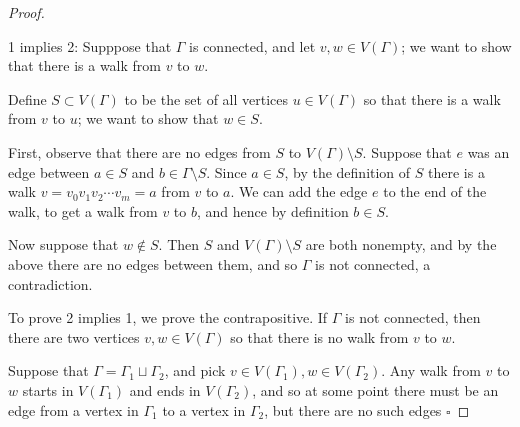 \documentclass[10pt,]{book}
\theoremstyle{plain}
\theoremstyle{definition}
\theoremstyle{definition}
\theoremstyle{definition}
\theoremstyle{definition}
\numberwithin{equation}{section}
\begin{document}
\begin{proof}\hypertarget{proof-2}{}
\hypertarget{p-99}{}%
1 implies 2: Supppose that \(\Gamma\) is connected, and let \(v, w\in V(\Gamma)\); we want to show that there is a walk from \(v\) to \(w\).%
\par
\hypertarget{p-100}{}%
Define \(S\subset V(\Gamma)\) to be the set of all vertices \(u\in V(\Gamma)\) so that there is a walk from \(v\) to \(u\); we want to show that \(w\in S\).%
\par
\hypertarget{p-101}{}%
First, observe that there are no edges from \(S\) to \(V(\Gamma)\setminus S\).  Suppose that \(e\) was an edge between \(a\in S\) and \(b\in\Gamma\setminus S\).  Since \(a\in S\), by the definition of \(S\) there is a walk \(v=v_0v_1v_2\cdots v_m=a\) from \(v\) to \(a\).  We can add the edge \(e\) to the end of the walk, to get a walk from \(v\) to \(b\), and hence by definition \(b\in S\).%
\par
\hypertarget{p-102}{}%
Now suppose that \(w\notin S\).  Then \(S\) and \(V(\Gamma)\setminus S\) are both nonempty, and by the above there are no edges between them, and so \(\Gamma\) is not connected, a contradiction.%
\par
\hypertarget{p-103}{}%
To prove 2 implies 1, we prove the contrapositive.  If \(\Gamma\) is not connected, then there are two vertices \(v,w\in V(\Gamma)\) so that there is no walk from \(v\) to \(w\).%
\par
\hypertarget{p-104}{}%
Suppose that \(\Gamma=\Gamma_1\sqcup\Gamma_2\), and pick \(v\in V(\Gamma_1), w\in V(\Gamma_2)\).  Any walk from \(v\) to \(w\) starts in \(V(\Gamma_1)\) and ends in \(V(\Gamma_2)\), and so at some point there must be an edge from a vertex in \(\Gamma_1\) to a vertex in \(\Gamma_2\), but there are no such edges \(\square\)%
\end{proof}
\typeout{************************************************}
\typeout{************************************************}
\end{document}
